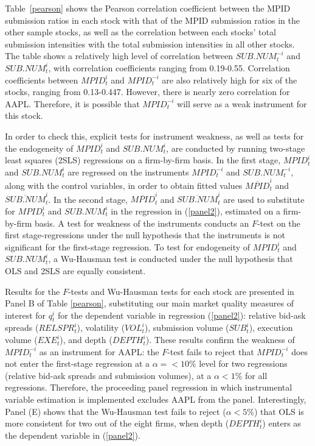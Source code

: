 \documentclass{article}
\begin{document}
Table~\ref{pearson} shows the Pearson correlation coefficient between the MPID submission ratios in each stock with that of the MPID submission ratios in the other sample stocks, as well as the correlation between each stocks' total submission intensities with the total submission intensities in all other stocks. The table shows a relatively high level of correlation between $SUB.NUM_t^{-i}$ and $SUB.NUM_t^{i}$, with correlation coefficients ranging from 0.19-0.55. Correlation coefficients between $MPID_t^{i}$ and $MPID_t^{-i}$ are also relatively high for six of the stocks, ranging from 0.13-0.447. However, there is nearly zero correlation for AAPL. Therefore, it is possible that $MPID_t^{-i}$ will serve as a weak instrument for this stock.

In order to check this, explicit tests for instrument weakness, as well as tests for the endogeneity of $MPID_t^{i}$ and $SUB.NUM_t^{i}$, are conducted by running two-stage least squares (2SLS) regressions on a firm-by-firm basis. In the first stage, $MPID_t^{i}$ and $SUB.NUM_t^{i}$ are regressed on the instruments $MPID_t^{-i}$ and $SUB.NUM_t^{-i}$, along with the control variables, in order to obtain fitted values $\overline{MPID}_t^{i}$ and $\overline{SUB.NUM}_t^{i}$. In the second stage, $\overline{MPID}_t^{i}$ and $\overline{SUB.NUM}_t^{i}$ are used to substitute for $MPID_t^{i}$ and $SUB.NUM_t^{i}$ in the regression in (\ref{panel2}), estimated on a firm-by-firm basis. A test for weakness of the instruments conducts an $F$-test on the first stage-regressions under the null hypothesis that the instruments is not significant for the first-stage regression. To test for endogeneity of $MPID_t^{i}$ and $SUB.NUM_t^{i}$, a Wu-Hausman test is conducted under the null hypothesis that OLS and 2SLS are equally consistent.

Results for the $F$-tests and Wu-Hausman tests for each stock are presented in Panel B of Table \ref{pearson}, substituting our main market quality measures of interest for $q_t^{i}$ for the dependent variable in regression (\ref{panel2}): relative bid-ask spreads ($RELSPR_t^i$), volatility ($VOL_t^i$), submission volume ($SUB_t^i$), execution volume ($EXE_t^i$), and depth ($DEPTH_t^i$). These results confirm the weakness of $MPID_t^{-i}$ as an instrument for AAPL: the $F$-test fails to reject that $MPID_t^{-i}$ does not enter the first-stage regression at a $\alpha=<10\%$ level for two regressions (relative bid-ask spreads and submission volumes), at a $\alpha<1\%$ for all regressions. Therefore, the proceeding panel regression in which instrumental variable estimation is implemented excludes AAPL from the panel. Interestingly, Panel (E) shows that the Wu-Hausman test fails to reject ($\alpha<5\%$) that OLS is more consistent for two out of the eight firms, when depth ($DEPTH_t^i$) enters as the dependent variable in (\ref{panel2}). 
\end{document}
